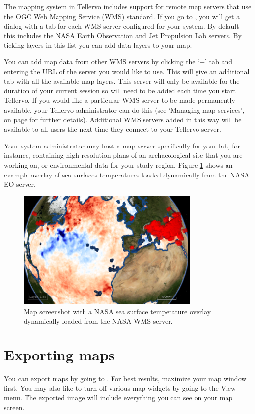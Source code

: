 The mapping system in Tellervo includes support for remote map servers that use the OGC Web Mapping Service (WMS) standard. If you go to , you will get a dialog with a tab for each WMS server configured for your system. By default this includes the NASA Earth Observation and Jet Propulsion Lab servers.  By ticking layers in this list you can add data layers to your map.

You can add map data from other WMS servers by clicking the `+' tab and entering the URL of the server you would like to use.  This will give an additional tab with all the available map layers.  This server will only be available for the duration of your current session so will need to be added each time you start Tellervo.  If you would like a particular WMS server to be made permanently available, your Tellervo administrator can do this (see `Managing map services', on page \pageref{txt:managingmaps} for further details).  Additional WMS servers added in this way will be available to all users the next time they connect to your Tellervo server.

Your system administrator may host a map server specifically for your lab, for instance, containing high resolution plans of an archaeological site that you are working on, or environmental data for your study region. Figure \ref{fig:wms} shows an example overlay of sea surfaces temperatures loaded dynamically from the NASA EO server.

\begin{figure}[hbtp]
  \centering
  \includegraphics[width=0.8\textwidth]{Images/sst.png}
  \caption{Map screenshot with a NASA sea surface temperature overlay dynamically loaded from the NASA WMS server.}
  \label{fig:wms}
\end{figure}





\section{Exporting maps}
You can export maps by going to . For best results, maximize your map window first. You may also like to turn off various map widgets by going to the View menu. The exported image will include everything you can see on your map screen. 


